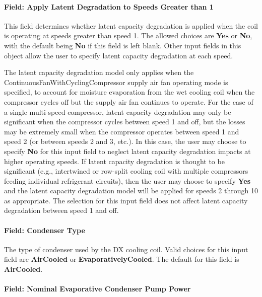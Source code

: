 \paragraph{Field: Apply Latent Degradation to Speeds Greater than 1}

This field determines whether latent capacity degradation is applied when the coil is operating at speeds greater than speed 1. The allowed choices are \textbf{Yes} or \textbf{No}, with the default being \textbf{No} if this field is left blank. Other input fields in this object allow the user to specify latent capacity degradation at each speed.

The latent capacity degradation model only applies when the ContinuousFanWithCyclingCompressor supply air fan operating mode is specified, to account for moisture evaporation from the wet cooling coil when the compressor cycles off but the supply air fan continues to operate. For the case of a single multi-speed compressor, latent capacity degradation may only be significant when the compressor cycles between speed 1 and off, but the losses may be extremely small when the compressor operates between speed 1 and speed 2 (or between speeds 2 and 3, etc.). In this case, the user may choose to specify \textbf{No} for this input field to neglect latent capacity degradation impacts at higher operating speeds. If latent capacity degradation is thought to be significant (e.g., intertwined or row-split cooling coil with multiple compressors feeding individual refrigerant circuits), then the user may choose to specify \textbf{Yes} and the latent capacity degradation model will be applied for speeds 2 through 10 as appropriate. The selection for this input field does not affect latent capacity degradation between speed 1 and off.

\paragraph{Field: Condenser Type}

The type of condenser used by the DX cooling coil. Valid choices for this input field are \textbf{AirCooled} or \textbf{EvaporativelyCooled}. The default for this field is \textbf{AirCooled}.

\paragraph{Field: Nominal Evaporative Condenser Pump Power}\label{field-nominal-evaporative-condenser-pump-power-1}

